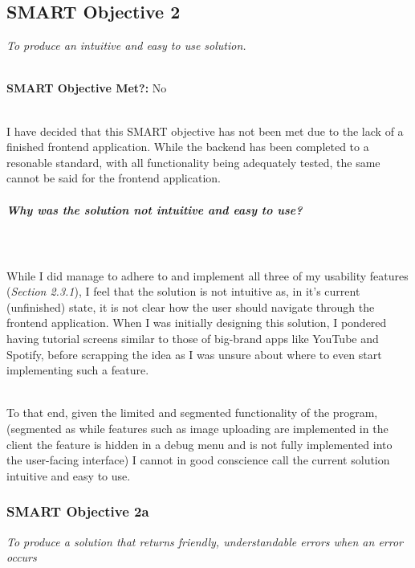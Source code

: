 \documentclass[../main.tex]{subfiles}
\begin{document}



\subsection{SMART Objective 2}

\textit{To produce an intuitive and easy to use solution.}

\noindent \\ \textbf{SMART Objective Met?:} No

\noindent \\ I have decided that this SMART objective has not been met due to the lack of a
finished frontend application. While the backend has been completed to a resonable standard,
with all functionality being adequately tested, the same cannot be said for the frontend
application.

\subparagraph{Why was the solution not intuitive and easy to use?}

\noindent \\\\ While I did manage to adhere to and implement all three of my usability
features (\textit{Section 2.3.1}), I feel that the solution is not intuitive as, in it's
current (unfinished) state, it is not clear how the user should navigate through the
frontend application. When I was initially designing this solution, I pondered having
tutorial screens similar to those of big-brand apps like YouTube and Spotify, before
scrapping the idea as I was unsure about where to even start implementing such a feature.

\noindent \\ To that end, given the limited and segmented functionality of the program, (segmented as
while features such as image uploading are implemented in the client the feature is hidden
in a debug menu and is not fully implemented into the user-facing interface) I cannot
in good conscience call the current solution intuitive and easy to use.

\subsubsection{SMART Objective 2a}

\textit{To produce a solution that returns friendly, understandable errors when
    an error occurs}
\end{document}
